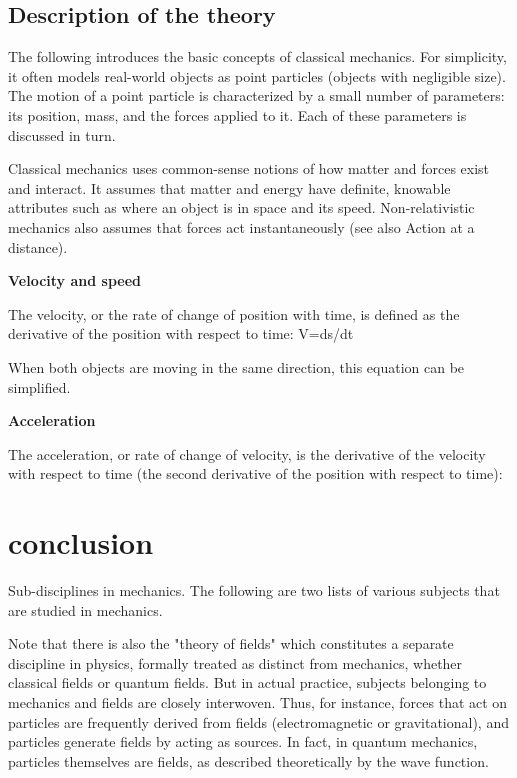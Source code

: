 \documentclass[12pt,a4paper]{article}
\begin{document}
\begin{titlepage}
\subsection{Description of the theory}

The following introduces the basic concepts of classical mechanics. For simplicity, it often models real-world objects as point particles (objects with negligible size). The motion of a point particle is characterized by a small number of parameters: its position, mass, and the forces applied to it. Each of these parameters is discussed in turn.

Classical mechanics uses common-sense notions of how matter and forces exist and interact. It assumes that matter and energy have definite, knowable attributes such as where an object is in space and its speed. Non-relativistic mechanics also assumes that forces act instantaneously (see also Action at a distance).
 
 {\bf {\large Velocity and speed}}

The velocity, or the rate of change of position with time, is defined as the derivative of the position with respect to time: V=ds/dt

When both objects are moving in the same direction, this equation can be simplified.

    
{\bf {\large Acceleration}}

 The acceleration, or rate of change of velocity, is the derivative of the velocity with respect to time (the second derivative of the position with respect to time):
 

\end{titlepage}
 

\section{conclusion}

Sub-disciplines in mechanics.
The following are two lists of various subjects that are studied in mechanics.

Note that there is also the "theory of fields" which constitutes a separate discipline in physics, formally treated as distinct from mechanics, whether classical fields or quantum fields. But in actual practice, subjects belonging to mechanics and fields are closely interwoven. Thus, for instance, forces that act on particles are frequently derived from fields (electromagnetic or gravitational), and particles generate fields by acting as sources. In fact, in quantum mechanics, particles themselves are fields, as described theoretically by the wave function.
\end{document}
